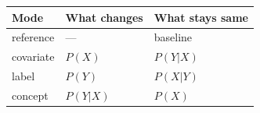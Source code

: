 \documentclass[10pt,a4paper]{article}
\begin{document}
\vspace{0.5em}
\begin{center}
\renewcommand{\arraystretch}{1.4}
\begin{tabular}{|>{\ttfamily}l|l|l|}
    \hline
    \normalfont\textbf{Mode} & \textbf{What changes} & \textbf{What stays same} \\
    \hline
    reference & --- & baseline \\
    covariate & $P(X)$ & $P(Y|X)$ \\
    label     & $P(Y)$ & $P(X|Y)$ \\
    concept   & $P(Y|X)$ & $P(X)$ \\
    \hline
\end{tabular}
\end{center}
\end{document}

